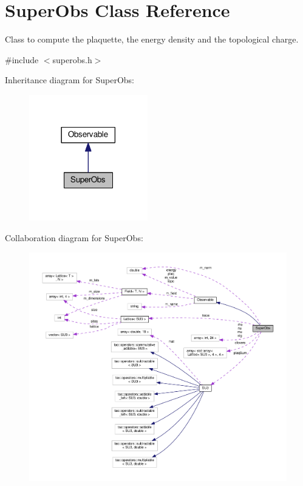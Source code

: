\hypertarget{classSuperObs}{}\section{Super\+Obs Class Reference}
\label{classSuperObs}


Class to compute the plaquette, the energy density and the topological charge.  




{\ttfamily \#include $<$superobs.\+h$>$}



Inheritance diagram for Super\+Obs\+:\nopagebreak
\begin{figure}[H]
\begin{center}
\leavevmode
\includegraphics[width=146pt]{d9/d4c/classSuperObs__inherit__graph}
\end{center}
\end{figure}


Collaboration diagram for Super\+Obs\+:\nopagebreak
\begin{figure}[H]
\begin{center}
\leavevmode
\includegraphics[width=350pt]{d0/d3f/classSuperObs__coll__graph}
\end{center}
\end{figure}
